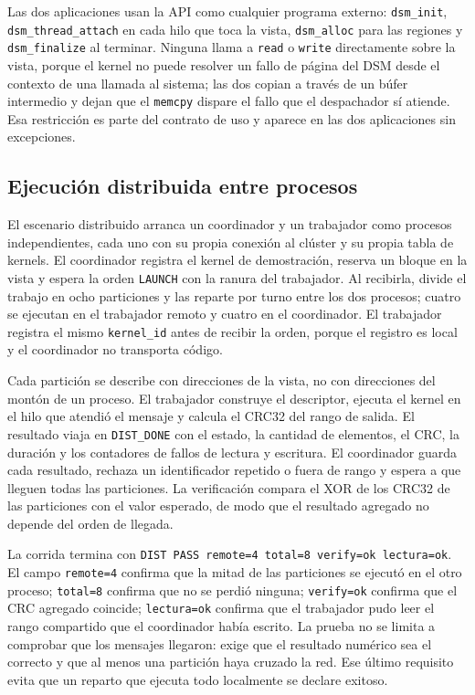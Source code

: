 Las dos aplicaciones usan la API como cualquier programa externo: \texttt{dsm\_init}, \texttt{dsm\_thread\_attach} en cada hilo que toca la vista, \texttt{dsm\_alloc} para las regiones y \texttt{dsm\_finalize} al terminar. Ninguna llama a \texttt{read} o \texttt{write} directamente sobre la vista, porque el kernel no puede resolver un fallo de página del DSM desde el contexto de una llamada al sistema; las dos copian a través de un búfer intermedio y dejan que el \texttt{memcpy} dispare el fallo que el despachador sí atiende. Esa restricción es parte del contrato de uso y aparece en las dos aplicaciones sin excepciones.

\subsection{Ejecución distribuida entre procesos}

El escenario distribuido arranca un coordinador y un trabajador como procesos independientes, cada uno con su propia conexión al clúster y su propia tabla de kernels. El coordinador registra el kernel de demostración, reserva un bloque en la vista y espera la orden \texttt{LAUNCH} con la ranura del trabajador. Al recibirla, divide el trabajo en ocho particiones y las reparte por turno entre los dos procesos; cuatro se ejecutan en el trabajador remoto y cuatro en el coordinador. El trabajador registra el mismo \texttt{kernel\_id} antes de recibir la orden, porque el registro es local y el coordinador no transporta código.

Cada partición se describe con direcciones de la vista, no con direcciones del montón de un proceso. El trabajador construye el descriptor, ejecuta el kernel en el hilo que atendió el mensaje y calcula el CRC32 del rango de salida. El resultado viaja en \texttt{DIST\_DONE} con el estado, la cantidad de elementos, el CRC, la duración y los contadores de fallos de lectura y escritura. El coordinador guarda cada resultado, rechaza un identificador repetido o fuera de rango y espera a que lleguen todas las particiones. La verificación compara el XOR de los CRC32 de las particiones con el valor esperado, de modo que el resultado agregado no depende del orden de llegada.

La corrida termina con \texttt{DIST PASS remote=4 total=8 verify=ok lectura=ok}. El campo \texttt{remote=4} confirma que la mitad de las particiones se ejecutó en el otro proceso; \texttt{total=8} confirma que no se perdió ninguna; \texttt{verify=ok} confirma que el CRC agregado coincide; \texttt{lectura=ok} confirma que el trabajador pudo leer el rango compartido que el coordinador había escrito. La prueba no se limita a comprobar que los mensajes llegaron: exige que el resultado numérico sea el correcto y que al menos una partición haya cruzado la red. Ese último requisito evita que un reparto que ejecuta todo localmente se declare exitoso.

